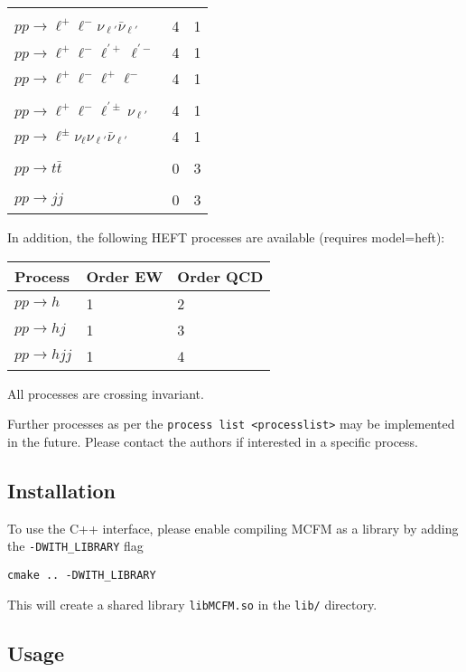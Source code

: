 \begin{longtable}[]{@{}lll@{}}
& & \\
\(pp\to \ell^+\ell^-\nu_{\ell'}\bar\nu_{\ell'}\) & 4 & 1 \\
\(pp\to \ell^+\ell^-\ell^{\prime+}\ell^{\prime-}\) & 4 & 1 \\
\(pp\to \ell^+\ell^-\ell^+\ell^-\) & 4 & 1 \\
& & \\
\(pp\to \ell^+\ell^-\ell^{\prime\pm}\nu_{\ell'}\) & 4 & 1 \\
\(pp\to \ell^\pm\nu_\ell\nu_{\ell'}\bar\nu_{\ell'}\) & 4 & 1 \\
& & \\
\(pp\to t \bar t\) & 0 & 3 \\
& & \\
\(pp\to j j\) & 0 & 3 \\
\bottomrule
\end{longtable}

In addition, the following HEFT processes are available (requires
model=heft):

\begin{longtable}[]{@{}lll@{}}
\toprule
Process & Order EW & Order QCD \\
\midrule
\endhead
\(pp\to h\) & 1 & 2 \\
\(pp\to h j\) & 1 & 3 \\
\(pp\to h j j\) & 1 & 4 \\
\bottomrule
\end{longtable}

All processes are crossing invariant.

Further processes as per the
{\lstinline!process list <processlist>!} may be
implemented in the future. Please contact the authors if interested in a
specific process.

\hypertarget{installation}{%
\subsection{Installation}\label{installation}}

To use the C++ interface, please enable compiling MCFM as a library by
adding the {\lstinline!-DWITH_LIBRARY!} flag

\begin{lstlisting}
cmake .. -DWITH_LIBRARY
\end{lstlisting}

This will create a shared library {\lstinline!libMCFM.so!}
in the {\lstinline!lib/!} directory.

\hypertarget{usage}{%
\subsection{Usage}\label{usage}}

